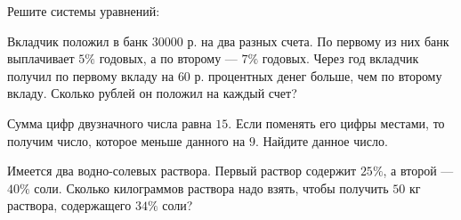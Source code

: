 \begin{homework}[number=2]
	\begin{listofex}
		\item Решите системы уравнений:
		\begin{itasks}[2]
			\task {}
			\task {}
			\task {}
			\task {}
		\end{itasks}
		\item Вкладчик положил в банк \( 30000 \) р. на два разных счета. По первому из них банк выплачивает \( 5\% \) годовых, а по второму --- \( 7\% \) годовых. Через год вкладчик получил по первому вкладу на \( 60 \) р. процентных денег больше, чем по второму вкладу. Сколько рублей он положил на каждый счет?
		\item Сумма цифр двузначного числа равна \( 15 \). Если поменять его цифры местами, то получим число, которое меньше данного на \( 9 \). Найдите данное число.
		\item Имеется два водно-солевых раствора. Первый раствор содержит \( 25\% \), а	второй --- \( 40\% \) соли. Сколько килограммов раствора надо взять, чтобы получить \( 50 \) кг раствора, содержащего \( 34\% \) соли?
	\end{listofex}
\end{homework}

